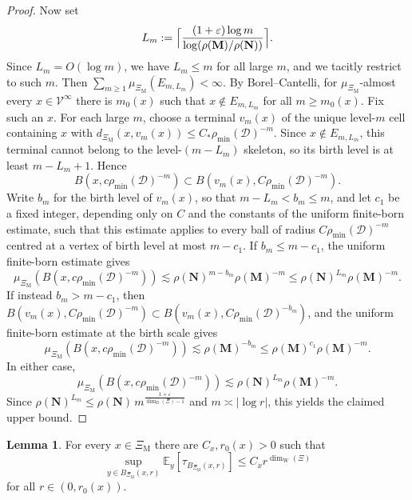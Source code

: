 \documentclass{article}
\theoremstyle{plain}
\theoremstyle{definition}
\newtheorem{lemma}[theorem]{Lemma}
\newcommand{\dimdeg}{\dim_\mathrm{D}}
\newcommand{\dimwalk}{\dim_\mathrm{W}}
\begin{document}
\begin{proof}
Now set
\[
L_m
:=
\Bigl\lceil
\frac{(1+\varepsilon)\log m}{\log(\rho(\mathbf M)/\rho(\mathbf N))}
\Bigr\rceil.
\]
Since $L_m=O(\log m)$, we have $L_m\le m$ for all large $m$, and we tacitly restrict to such $m$.
Then $\sum_{m\ge 1}\mu_{\Xi_{\mathrm M}}(E_{m,L_m})<\infty$.
By Borel--Cantelli, for $\mu_{\Xi_{\mathrm M}}$-almost every $x\in\mathscr V^\infty$ there is $m_0(x)$ such that $x\notin E_{m,L_m}$ for all $m\ge m_0(x)$.
Fix such an $x$.
For each large $m$, choose a terminal $v_m(x)$ of the unique level-$m$ cell containing $x$ with $d_{\Xi_{\mathrm M}}(x,v_m(x))\le C_*\rho_{\min}(\mathcal D)^{-m}$.
Since $x\notin E_{m,L_m}$, this terminal cannot belong to the level-$(m-L_m)$ skeleton, so its birth level is at least $m-L_m+1$.
Hence
\[
B(x,c\rho_{\min}(\mathcal D)^{-m})
\subset
B(v_m(x),C\rho_{\min}(\mathcal D)^{-m}).
\]
Write $b_m$ for the birth level of $v_m(x)$, so that $m-L_m<b_m\le m$, and let $c_1$ be a fixed integer, depending only on $C$ and the constants of the uniform finite-born estimate, such that this estimate applies to every ball of radius $C\rho_{\min}(\mathcal D)^{-m}$ centred at a vertex of birth level at most $m-c_1$.
If $b_m\le m-c_1$, the uniform finite-born estimate gives
\[
\mu_{\Xi_{\mathrm M}}(B(x,c\rho_{\min}(\mathcal D)^{-m}))
\lesssim
\rho(\mathbf N)^{m-b_m}\rho(\mathbf M)^{-m}
\le
\rho(\mathbf N)^{L_m}\rho(\mathbf M)^{-m}.
\]
If instead $b_m>m-c_1$, then $B(v_m(x),C\rho_{\min}(\mathcal D)^{-m})\subset B(v_m(x),C\rho_{\min}(\mathcal D)^{-b_m})$, and the uniform finite-born estimate at the birth scale gives
\[
\mu_{\Xi_{\mathrm M}}(B(x,c\rho_{\min}(\mathcal D)^{-m}))
\lesssim
\rho(\mathbf M)^{-b_m}
\le
\rho(\mathbf M)^{c_1}\rho(\mathbf M)^{-m}.
\]
In either case,
\[
\mu_{\Xi_{\mathrm M}}(B(x,c\rho_{\min}(\mathcal D)^{-m}))
\lesssim
\rho(\mathbf N)^{L_m}\rho(\mathbf M)^{-m}.
\]
Since $\rho(\mathbf N)^{L_m}\le \rho(\mathbf N)\,m^{\frac{1+\varepsilon}{\dimdeg(\Xi)-1}}$ and $m\asymp |\log r|$, this yields the claimed upper bound.
\end{proof}

\begin{lemma}\label{lem:heat-exit}
For every $x\in \Xi_{\mathrm M}$ there are $C_x,r_0(x)>0$ such that
\[
\sup_{y\in B_{\Xi_{\mathrm M}}(x,r)}
\mathbb E_y[\tau_{B_{\Xi_{\mathrm M}}(x,r)}]
\le
C_x r^{\dimwalk(\Xi)}
\]
for all $r\in(0,r_0(x))$.
\end{lemma}
\end{document}
